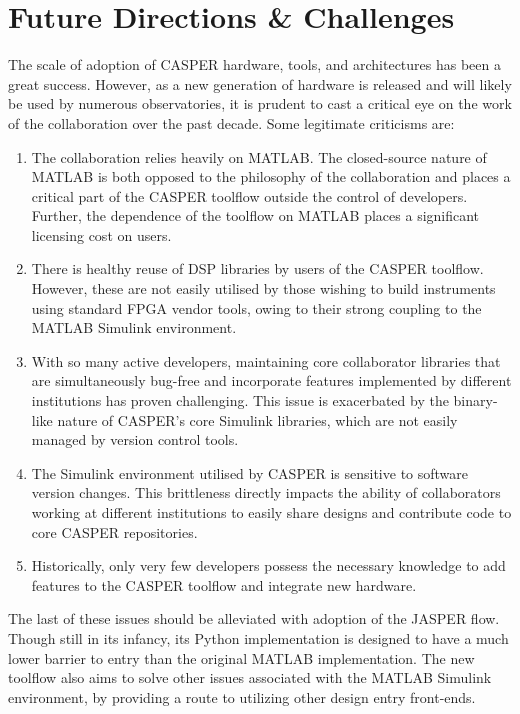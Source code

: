 \documentclass{ws-jai}
\begin{document}
\section{Future Directions \& Challenges} \label{sec:Future}
The scale of adoption of CASPER hardware, tools, and architectures has been a great success. However, as a new generation of hardware is released and will likely be used by numerous observatories, it is prudent to cast a critical eye on the work of the collaboration over the past decade. Some legitimate criticisms are:
\begin{enumerate}
    \item The collaboration relies heavily on MATLAB. The closed-source nature of MATLAB is both opposed to the philosophy of the collaboration and places a critical part of the CASPER toolflow outside the control of developers. Further, the dependence of the toolflow on MATLAB places a significant licensing cost on users.

    \item There is healthy reuse of DSP libraries by users of the CASPER toolflow. However, these are not easily utilised by those wishing to build instruments using standard FPGA vendor tools, owing to their strong coupling to the MATLAB Simulink environment.

    \item With so many active developers, maintaining core collaborator libraries that are simultaneously bug-free and incorporate features implemented by different institutions has proven challenging. This issue is exacerbated by the binary-like nature of CASPER's core Simulink libraries, which are not easily managed by version control tools.

    \item The Simulink environment utilised by CASPER is sensitive to software version changes. This brittleness directly impacts the ability of collaborators working at different institutions to easily share designs and contribute code to core CASPER repositories.

    \item Historically, only very few developers possess the necessary knowledge to add features to the CASPER toolflow and integrate new hardware.
\end{enumerate}

The last of these issues should be alleviated with adoption of the JASPER flow. Though still in its infancy, its Python implementation is designed to have a much lower barrier to entry than the original MATLAB implementation. The new toolflow also aims to solve other issues associated with the MATLAB Simulink environment, by providing a route to utilizing other design entry front-ends.
\end{document}
